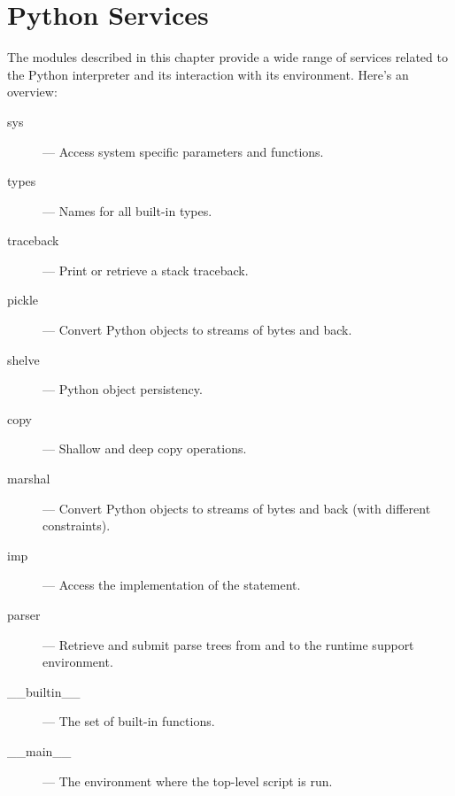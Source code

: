 \chapter{Python Services}

The modules described in this chapter provide a wide range of services
related to the Python interpreter and its interaction with its
environment.  Here's an overview:

\begin{description}

\item[sys]
--- Access system specific parameters and functions.

\item[types]
--- Names for all built-in types.

\item[traceback]
--- Print or retrieve a stack traceback.

\item[pickle]
--- Convert Python objects to streams of bytes and back.

\item[shelve]
--- Python object persistency.

\item[copy]
--- Shallow and deep copy operations.

\item[marshal]
--- Convert Python objects to streams of bytes and back (with
different constraints).

\item[imp]
--- Access the implementation of the  statement.

\item[parser]
--- Retrieve and submit parse trees from and to the runtime support
environment.

\item[__builtin__]
--- The set of built-in functions.

\item[__main__]
--- The environment where the top-level script is run.

\end{description}
